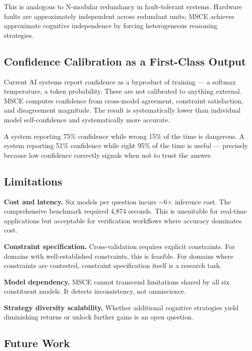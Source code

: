 \documentclass[11pt,a4paper]{article}
\begin{document}
This is analogous to N-modular redundancy in fault-tolerant systems. Hardware faults are approximately independent across redundant units; MSCE achieves approximate cognitive independence by forcing heterogeneous reasoning strategies.

\subsection{Confidence Calibration as a First-Class Output}

Current AI systems report confidence as a byproduct of training — a softmax temperature, a token probability. These are not calibrated to anything external. MSCE computes confidence from cross-model agreement, constraint satisfaction, and disagreement magnitude. The result is systematically lower than individual model self-confidence and systematically more accurate.

A system reporting 75\% confidence while wrong 15\% of the time is dangerous. A system reporting 51\% confidence while right 95\% of the time is useful — precisely because low confidence correctly signals when not to trust the answer.

\subsection{Limitations}

\textbf{Cost and latency.} Six models per question incurs $\sim$6$\times$ inference cost. The comprehensive benchmark required 4,874 seconds. This is unsuitable for real-time applications but acceptable for verification workflows where accuracy dominates cost.

\textbf{Constraint specification.} Cross-validation requires explicit constraints. For domains with well-established constraints, this is feasible. For domains where constraints are contested, constraint specification itself is a research task.

\textbf{Model dependency.} MSCE cannot transcend limitations shared by all six constituent models. It detects inconsistency, not omniscience.

\textbf{Strategy diversity scalability.} Whether additional cognitive strategies yield diminishing returns or unlock further gains is an open question.

\subsection{Future Work}
\end{document}
